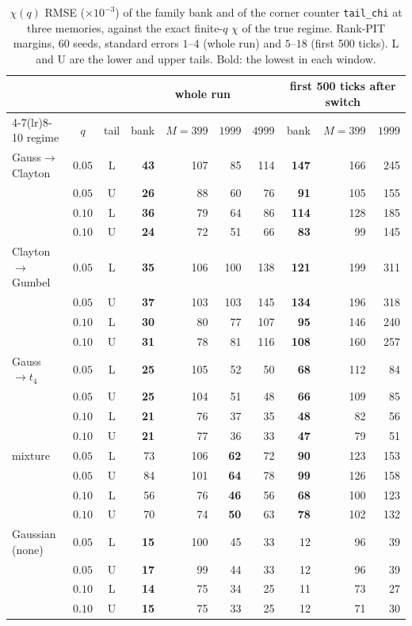 \begin{table}[ht]
  \centering
  \caption{$\chi(q)$ RMSE ($\times10^{-3}$) of the family bank and of the corner counter
    \texttt{tail\_chi} at three memories, against the exact finite-$q$ $\chi$ of the true regime.
    Rank-PIT margins, 60 seeds, standard errors $1$--$4$ (whole run) and $5$--$18$ (first 500
    ticks). L and U are the lower and upper tails. Bold: the lowest in each window.}
  \label{tab:chi}
  \small
  \begin{tabular}{lcc rrrr rrr}
    \toprule
    & & & \multicolumn{4}{c}{whole run} & \multicolumn{3}{c}{first 500 ticks after switch} \\
    \cmidrule(lr){4-7}\cmidrule(lr){8-10}
    regime & $q$ & tail & bank & $M{=}399$ & $1999$ & $4999$ & bank & $M{=}399$ & $1999$ \\
    \midrule
    Gauss$\to$Clayton & $0.05$ & L & \textbf{43} & 107 & 85 & 114 & \textbf{147} & 166 & 245 \\
     & $0.05$ & U & \textbf{26} & 88 & 60 & 76 & \textbf{91} & 105 & 155 \\
     & $0.10$ & L & \textbf{36} & 79 & 64 & 86 & \textbf{114} & 128 & 185 \\
     & $0.10$ & U & \textbf{24} & 72 & 51 & 66 & \textbf{83} & 99 & 145 \\
    Clayton$\to$Gumbel & $0.05$ & L & \textbf{35} & 106 & 100 & 138 & \textbf{121} & 199 & 311 \\
     & $0.05$ & U & \textbf{37} & 103 & 103 & 145 & \textbf{134} & 196 & 318 \\
     & $0.10$ & L & \textbf{30} & 80 & 77 & 107 & \textbf{95} & 146 & 240 \\
     & $0.10$ & U & \textbf{31} & 78 & 81 & 116 & \textbf{108} & 160 & 257 \\
    Gauss$\to t_4$ & $0.05$ & L & \textbf{25} & 105 & 52 & 50 & \textbf{68} & 112 & 84 \\
     & $0.05$ & U & \textbf{25} & 104 & 51 & 48 & \textbf{66} & 109 & 85 \\
     & $0.10$ & L & \textbf{21} & 76 & 37 & 35 & \textbf{48} & 82 & 56 \\
     & $0.10$ & U & \textbf{21} & 77 & 36 & 33 & \textbf{47} & 79 & 51 \\
    mixture & $0.05$ & L & 73 & 106 & \textbf{62} & 72 & \textbf{90} & 123 & 153 \\
     & $0.05$ & U & 84 & 101 & \textbf{64} & 78 & \textbf{99} & 126 & 158 \\
     & $0.10$ & L & 56 & 76 & \textbf{46} & 56 & \textbf{68} & 100 & 123 \\
     & $0.10$ & U & 70 & 74 & \textbf{50} & 63 & \textbf{78} & 102 & 132 \\
    Gaussian (none) & $0.05$ & L & \textbf{15} & 100 & 45 & 33 & 12 & 96 & 39 \\
     & $0.05$ & U & \textbf{17} & 99 & 44 & 33 & 12 & 96 & 39 \\
     & $0.10$ & L & \textbf{14} & 75 & 34 & 25 & 11 & 73 & 27 \\
     & $0.10$ & U & \textbf{15} & 75 & 33 & 25 & 12 & 71 & 30 \\
    \bottomrule
  \end{tabular}
\end{table}

